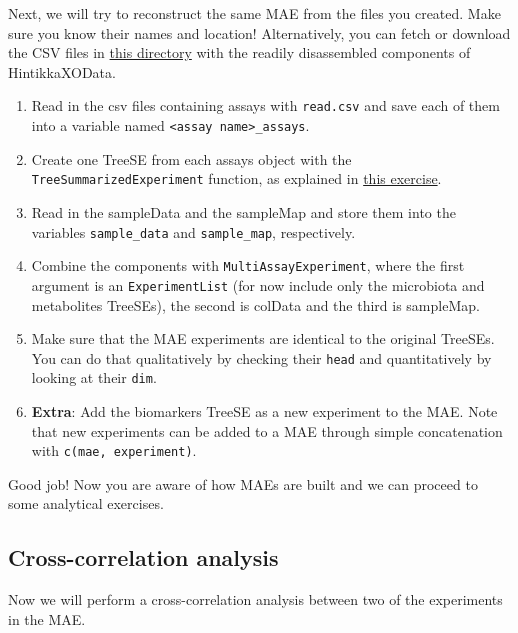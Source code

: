 \documentclass[
]{book}
\providecommand{\tightlist}{%
  \setlength{\itemsep}{0pt}\setlength{\parskip}{0pt}}
\begin{document}
Next, we will try to reconstruct the same MAE from the files you created.
Make sure you know their names and location! Alternatively, you can fetch or
download the CSV files in
\href{https://github.com/microbiome/data/tree/main/HintikkaXOData}{this directory}
with the readily disassembled components of HintikkaXOData.

\begin{enumerate}
\def\labelenumi{\arabic{enumi}.}
\tightlist
\item
  Read in the csv files containing assays with \texttt{read.csv} and save each
  of them into a variable named \texttt{\textless{}assay\ name\textgreater{}\_assays}.
\item
  Create one TreeSE from each assays object with the \texttt{TreeSummarizedExperiment}
  function, as explained in \protect\hyperlink{construct-TreeSE}{this exercise}.
\item
  Read in the sampleData and the sampleMap and store them into the
  variables \texttt{sample\_data} and \texttt{sample\_map}, respectively.
\item
  Combine the components with \texttt{MultiAssayExperiment}, where the first argument
  is an \texttt{ExperimentList} (for now include only the microbiota and metabolites
  TreeSEs), the second is colData and the third is sampleMap.
\item
  Make sure that the MAE experiments are identical to the original TreeSEs. You
  can do that qualitatively by checking their \texttt{head} and quantitatively by
  looking at their \texttt{dim}.
\item
  \textbf{Extra}: Add the biomarkers TreeSE as a new experiment to the MAE.
  Note that new experiments can be added to a MAE through simple concatenation
  with \texttt{c(mae,\ experiment)}.
\end{enumerate}

Good job! Now you are aware of how MAEs are built and we can proceed to some
analytical exercises.

\hypertarget{cross-correlation-analysis}{%
\subsection{Cross-correlation analysis}\label{cross-correlation-analysis}}

Now we will perform a cross-correlation analysis between two of the
experiments in the MAE.
\end{document}
